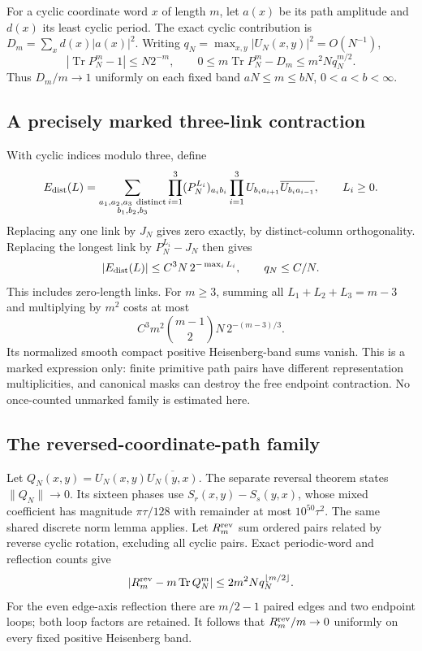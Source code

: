 For a cyclic coordinate word $x$ of length $m$, let $a(x)$ be its path
amplitude and $d(x)$ its least cyclic period. The exact cyclic contribution
is $D_m=\sum_xd(x)|a(x)|^2$. Writing $q_N=\max_{x,y}|U_N(x,y)|^2=O(N^{-1})$,
\[
 |\operatorname{Tr}P_N^m-1|\le N2^{-m},\qquad
 0\le m\operatorname{Tr}P_N^m-D_m\le m^2Nq_N^{m/2}.
\]
Thus $D_m/m\to1$ uniformly on each fixed band $aN\le m\le bN$,
$0<a<b<\infty$.

\subsection{A precisely marked three-link contraction}
With cyclic indices modulo three, define
\[
 E_{\rm dist}(L)=
 \sum_{\substack{a_1,a_2,a_3\ \mathrm{distinct}\\b_1,b_2,b_3}}
 \prod_{i=1}^3(P_N^{L_i})_{a_i b_i}
 \prod_{i=1}^3 U_{b_i a_{i+1}}
                  \overline{U_{b_i a_{i-1}}},\qquad L_i\ge0.
\]
Replacing any one link by $J_N$ gives zero exactly, by distinct-column
orthogonality. Replacing the longest link by $P_N^{L_i}-J_N$ then gives
\[
 |E_{\rm dist}(L)|\le C^3N\,2^{-\max_iL_i},
 \qquad q_N\le C/N.
\]
This includes zero-length links. For $m\ge3$, summing all
$L_1+L_2+L_3=m-3$ and multiplying by $m^2$ costs at most
\[
 C^3m^2\binom{m-1}{2}N\,2^{-(m-3)/3}.
\]
Its normalized smooth compact positive Heisenberg-band sums vanish.
This is a marked expression only: finite primitive path pairs have different
representation multiplicities, and canonical masks can destroy the free
endpoint contraction. No once-counted unmarked family is estimated here.

\subsection{The reversed-coordinate-path family}
Let $Q_N(x,y)=U_N(x,y)\overline{U_N(y,x)}$. The separate reversal theorem
states $\|Q_N\|\to0$. Its sixteen phases use
$S_r(x,y)-S_s(y,x)$, whose mixed coefficient has magnitude
$\pi\tau/128$ with remainder at most $10^{50}\tau^2$.
The same shared discrete norm lemma applies.
Let $R_m^{\rm rev}$ sum ordered pairs related by reverse cyclic rotation,
excluding all cyclic pairs. Exact periodic-word and reflection counts give
\[
 |R_m^{\rm rev}-m\operatorname{Tr}Q_N^m|
 \le2m^2Nq_N^{\lfloor m/2\rfloor}.
\]
For the even edge-axis reflection there are $m/2-1$ paired edges and two
endpoint loops; both loop factors are retained. It follows that
$R_m^{\rm rev}/m\to0$ uniformly on every fixed positive Heisenberg band.

